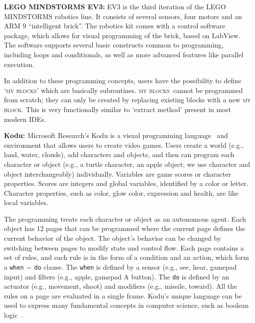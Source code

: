 \documentclass[conference]{IEEEtran}
\newcommand{\ms}{LEGO MINDSTORMS EV3}
\newcommand{\mbs}{\textsc{my blocks}}
\newcommand{\mb}{\textsc{my block}}
\begin{document}
 \textbf{\ms:}
EV3 is the third iteration of the LEGO MINDSTORMS robotics line. It consists of several sensors, four motors and an ARM 9 ``intelligent brick''. The robotics kit comes with a control software package, which allows for visual programming of the brick, based on LabView. The software supports several basic constructs common to programming, including loops and conditionals, as well as more advanced features like parallel execution. 

In addition to these programming concepts, users have the possibility to define `\mbs' which are basically  subroutines. 
\mbs~cannot be programmed from scratch; they can only be created by replacing existing blocks with a new \mb. 
This is very functionally similar to `extract method' present in most modern IDEs. 



\textbf{Kodu:}
Microsoft Research's Kodu is a visual programming language~\cite{kodugrammar} and environment that allows users to create  video games. 
Users create a world (e.g., land, water, clouds),  add characters and objects, and then can program each character or object (e.g., a turtle character, an apple object; we use character and object interchangeably) individually. Variables are game scores or character properties. Scores are integers and global variables, identified by a color or letter. Character properties, such as color, glow color, expression and health, are like local variables. 

The programming treats each character or object as an autonomous agent. 
Each object has 12 pages that can be programmed  where the current page defines the current behavior of the object. 
The object's behavior can be changed by switching between pages to modify state and control flow. 
Each page contains a set of rules, and each rule is in the form of a condition and an action, which form a {\tt when~--~do} clause. 
The {\tt when} is defined by a sensor (e.g., see, hear, gamepad input) and filters (e.g., apple, gamepad A button). The {\tt do} is defined by an actuator (e.g., movement, shoot) and modifiers (e.g., missile, toward). 
All the rules on a page are evaluated in a single frame. 
Kodu's unique language  can be used to express many fundamental concepts in computer science, such as  boolean logic~\cite{Stolee:2011:ECS:1953163.1953197}. 
\end{document}
